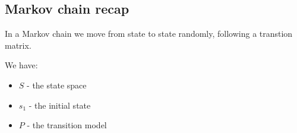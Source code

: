 \subsection{Markov chain recap}

In a Markov chain we move from state to state randomly, following a transtion matrix.

We have:

\begin{itemize}
\item \(S\) - the state space
\item \(s_1\) - the initial state
\item \(P\) - the transition model
\end{itemize}

